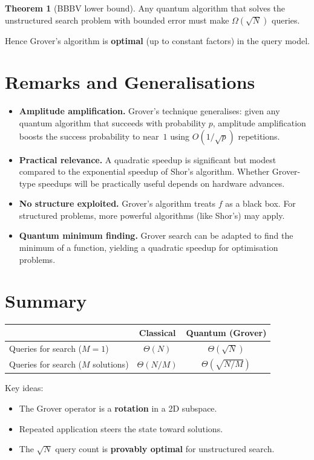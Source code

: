\documentclass[11pt]{article}
\theoremstyle{definition}
\newtheorem{theorem}{Theorem}[section]
\begin{document}
\begin{theorem}[BBBV lower bound]
Any quantum algorithm that solves the unstructured search problem with bounded error must make $\Omega(\sqrt{N})$ queries.
\end{theorem}

Hence Grover's algorithm is \textbf{optimal} (up to constant factors) in the query model.

\section{Remarks and Generalisations}

\begin{itemize}
    \item \textbf{Amplitude amplification.}  Grover's technique generalises: given any quantum algorithm that succeeds with probability $p$, amplitude amplification boosts the success probability to near~$1$ using $O(1/\sqrt{p})$ repetitions.
    \item \textbf{Practical relevance.}  A quadratic speedup is significant but modest compared to the exponential speedup of Shor's algorithm.  Whether Grover-type speedups will be practically useful depends on hardware advances.
    \item \textbf{No structure exploited.}  Grover's algorithm treats $f$ as a black box.  For structured problems, more powerful algorithms (like Shor's) may apply.
    \item \textbf{Quantum minimum finding.}  Grover search can be adapted to find the minimum of a function, yielding a quadratic speedup for optimisation problems.
\end{itemize}

\section{Summary}

\begin{center}
\begin{tabular}{lcc}
\hline
& \textbf{Classical} & \textbf{Quantum (Grover)} \\\hline
Queries for search ($M=1$) & $\Theta(N)$ & $\Theta(\sqrt{N})$ \\
Queries for search ($M$ solutions) & $\Theta(N/M)$ & $\Theta(\sqrt{N/M})$ \\
\hline
\end{tabular}
\end{center}

Key ideas:
\begin{itemize}
    \item The Grover operator is a \textbf{rotation} in a 2D subspace.
    \item Repeated application steers the state toward solutions.
    \item The $\sqrt{N}$ query count is \textbf{provably optimal} for unstructured search.
\end{itemize}
\end{document}
